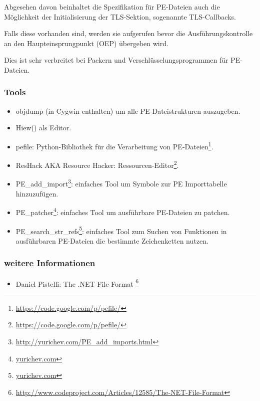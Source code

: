 Abgesehen davon beinhaltet die Spezifikation für PE-Dateien auch die Möglichkeit
der Initialisierung der \ac{TLS}-Sektion, sogenannte TLS-Callbacks.

Falls diese vorhanden sind, werden sie aufgerufen bevor die Ausführungskontrolle
an den Haupteinsprungpunkt (\ac{OEP}) übergeben wird.

Dies ist sehr verbreitet bei Packern und Verschlüsselungsprogrammen für PE-Dateien.

\subsubsection{Tools}

\label{ResHack}

\begin{itemize}
\item objdump (in Cygwin enthalten) um alle PE-Dateistrukturen auszugeben.

\item Hiew() als Editor.

\item pefile: Python-Bibliothek für die Verarbeitung von PE-Dateien\footnote{\url{https://code.google.com/p/pefile/}}.

\item ResHack \acs{AKA} Resource Hacker: Ressourcen-Editor\footnote{\url{https://code.google.com/p/pefile/}}.

\item PE\_add\_import\footnote{\url{http://yurichev.com/PE_add_imports.html}}: einfaches Tool
um Symbole zur PE Importtabelle hinzuzufügen.

\item PE\_patcher\footnote{\href{http://yurichev.com/PE_patcher.html}{yurichev.com}}:
einfaches Tool um ausführbare PE-Dateien zu patchen.

\item PE\_search\_str\_refs\footnote{\href{http://yurichev.com/PE_search_str_refs.html}{yurichev.com}}:
einfaches Tool zum Suchen von Funktionen in ausführbaren PE-Dateien die bestimmte
Zeichenketten nutzen.
\end{itemize}

\subsubsection{weitere Informationen}

\begin{itemize}
\item Daniel Pistelli: The .NET File Format \footnote{\url{http://www.codeproject.com/Articles/12585/The-NET-File-Format}}
\end{itemize}
